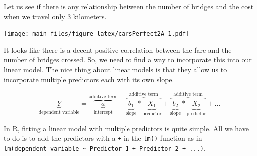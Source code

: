 \documentclass[
]{book}
\newenvironment{Shaded}{\begin{snugshade}}{\end{snugshade}}
\newcommand{\FunctionTok}[1]{\textcolor[rgb]{0.00,0.00,0.00}{#1}}
\newcommand{\NormalTok}[1]{#1}
\newcommand{\OtherTok}[1]{\textcolor[rgb]{0.56,0.35,0.01}{#1}}
\newcommand{\SpecialCharTok}[1]{\textcolor[rgb]{0.00,0.00,0.00}{#1}}
\begin{document}
Let us see if there is any relationship between the number of bridges and the cost when we travel only 3 kilometers.

\texttt{[image: main\_files/figure-latex/carsPerfect2A-1.pdf]}

It looks like there is a decent positive correlation between the fare and the number of bridges crossed. So, we need to find a way to incorporate this into our linear model. The nice thing about linear models is that they allow us to incorporate multiple predictors each with its own slope.

\[ \underbrace{Y}_{\text{dependent variable}} =
            \overbrace{\underbrace{a}_{\text{intercept}}}^{\text{additive term}} + 
            \overbrace{\underbrace{b_1}_{\text{slope}} * \underbrace{X_{1}}_{\text{predictor}}}^{\text{additive term}} + 
            \overbrace{\underbrace{b_2}_{\text{slope}} * \underbrace{X_{2} }_{\text{predictor}}}^{\text{additive term}} +  
            \ldots\]

In R, fitting a linear model with multiple predictors is quite simple. All we have to do is to add the predictors with a \texttt{+} in the \texttt{lm()} function as in \texttt{lm(dependent\ variable\ \textasciitilde{}\ Predictor\ 1\ +\ Predictor\ 2\ +\ ...)}.

\begin{Shaded}
\end{Shaded}

\begin{Shaded}
\end{Shaded}
\end{document}
